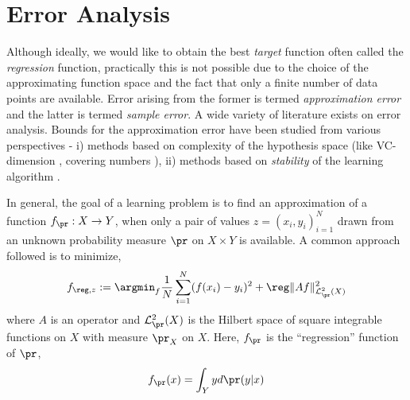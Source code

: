 \section{Error Analysis}
\label{s:erm_error}
Although ideally, we would like to obtain the best \textit{target} function often called the \textit{regression} function, practically this is not possible due to the choice of the approximating function space and the fact that only a finite number of data points are available. Error arising from the former is termed \textit{approximation error} and the latter is termed \textit{sample error}. A wide variety of literature exists on error analysis. Bounds for the approximation error have been studied from various perspectives - i) methods based on complexity of the hypothesis space (like VC-dimension \cite{gir95}, covering numbers \cite{zhou02, smazhou03, zhou03}), ii) methods based on \textit{stability} of the learning algorithm \cite{boueli01,boueli02}.

In general, the goal of a learning problem is to find an approximation of a function $f_\pr : X \to Y$, when only a pair of values $z = (x_i, y_i)_{i=1}^N$ drawn from an unknown probability measure $\pr$ on $X \times Y$ is available. A common approach followed is to minimize,
\[
f_{\reg,z} := \argmin_f \frac{1}{N}\sum_{i=1}^N (f(x_i) - y_i)^2 + \reg \|A f \|^2_{\mathcal{L}_{\pr}^2(X)}
\]
where $A$ is an operator and $\mathcal{L}^2_{\pr}(X)$ is the Hilbert space of square integrable functions on $X$ with measure $\pr_X$ on $X$. Here, $f_\pr$ is the ``regression'' function of $\pr$,
\begin{equation}
f_\pr(x) = \int_Y y d\pr(y|x)
\label{eq:f_rho}
\end{equation}

